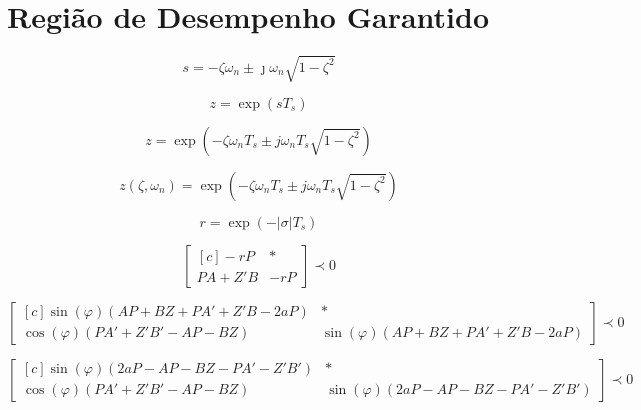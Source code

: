 \chapter{Região de Desempenho Garantido}

\begin{equation}
  s = -\zeta\omega_n \pm \jmath\omega_n \sqrt {1-\zeta^2} \label{eq:PontoPlanoS}
\end{equation}

\begin{equation}
  z = \exp(sT_s)\label{eq:TransformacaoSZ}
\end{equation}

\begin{equation}
  z = \exp{\left(-\zeta\omega_nT_s \pm j\omega_nT_s\sqrt{1-\zeta^2}\right)}\label{eq:PontoPlanoZ}
\end{equation}

\begin{equation}
  z(\zeta,\omega_n) = \exp{\left(-\zeta\omega_nT_s \pm j\omega_nT_s\sqrt{1-\zeta^2}\right)}\label{eq:FuncaoPontoZ}
\end{equation}

\begin{equation}
  r = \exp{\left(-|\sigma|T_s\right)}\label{eq:RaioEstabilidadeRelativa}
\end{equation}

\begin{equation}
  \begin{bmatrix*}[c]
    -rP       & * \\
    PA + Z'B  & -rP
  \end{bmatrix*}
  \prec 0\label{eq:LMIEstabilidadeRelativa}
\end{equation}

\begin{equation}
  \begin{bmatrix*}[c]
    \sin{(\varphi)(AP + BZ + PA' + Z'B -2aP)} & * \\
    \cos{(\varphi)(PA' + Z'B'- AP - BZ)}      &  \sin{(\varphi)(AP + BZ + PA' + Z'B -2aP)}
  \end{bmatrix*}
  \prec 0\label{eq:LMIESetorConicoEsquerdo}
\end{equation}

\begin{equation}
  \begin{bmatrix*}[c]
    \sin{(\varphi)(2aP - AP - BZ - PA' - Z'B')} & * \\
    \cos{(\varphi)(PA' + Z'B' - AP - BZ)}       & \sin{(\varphi)(2aP - AP - BZ - PA' - Z'B')}
  \end{bmatrix*}
  \prec 0\label{eq:LMIESetorConicoDireito}
\end{equation}

